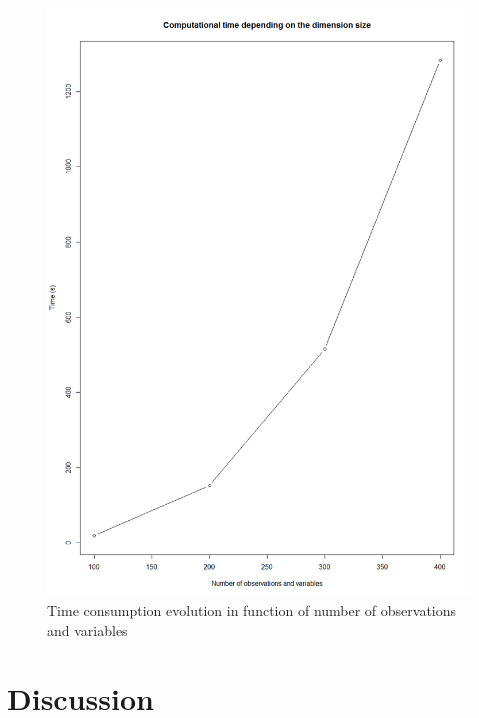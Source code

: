 \documentclass[twocolumn]{article}
\begin{document}
\begin{figure}[!]
    \centering
    \includegraphics[scale=0.3]{img/bothTime.png}
    \caption{Time consumption evolution in function of number of observations and variables}
    \label{fig:tpsBoth}
\end{figure}


\section{Discussion}
\end{document}
